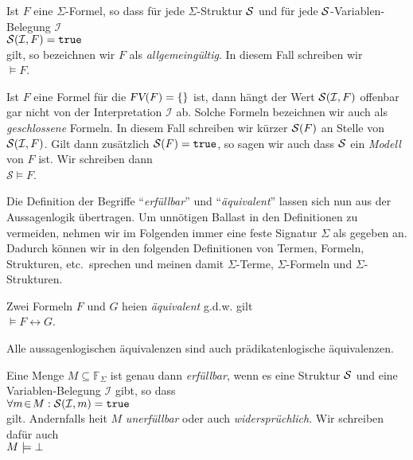 \begin{Definition}
    Ist $F$ eine $\Sigma$-Formel, so dass f\"{u}r jede $\Sigma$-Struktur $\mathcal{S}$ und f\"{u}r jede
    $\mathcal{S}$-Variablen-Belegung $\mathcal{I}$ \\[0.2cm]
    \hspace*{1.3cm} $\mathcal{S}(\mathcal{I}, F) = \mathtt{true}$ \\[0.2cm]
    gilt, so bezeichnen wir $F$ als \emph{allgemeing\"{u}ltig}.  In diesem Fall schreiben wir \\[0.2cm]
    \hspace*{1.3cm} $\models F$. 
    \eox
\end{Definition}

Ist $F$ eine Formel f\"{u}r die $\textsl{FV}(F) = \{\}$ ist, dann h\"{a}ngt der Wert $\mathcal{S}(\mathcal{I}, F)$
offenbar gar nicht von der Interpretation $\mathcal{I}$ ab.  Solche Formeln bezeichnen wir auch als 
\emph{geschlossene} Formeln.   In diesem Fall schreiben wir k\"{u}rzer  $\mathcal{S}(F)$
an Stelle von $\mathcal{S}(\mathcal{I}, F)$.  Gilt dann zus\"{a}tzlich $\mathcal{S}(F) = \mathtt{true}$, 
so sagen wir auch dass $\mathcal{S}$ ein \emph{Modell} von $F$ ist.  Wir schreiben dann \\[0.2cm]
\hspace*{1.3cm} $\mathcal{S} \models F$.
\vspace{0.1cm}

Die Definition der Begriffe ``\emph{erf\"{u}llbar}'' und
``\emph{\"{a}quivalent}'' lassen sich nun aus der Aussagenlogik \"{u}bertragen. 
Um unn\"{o}tigen Ballast in den Definitionen zu vermeiden, nehmen wir im Folgenden immer eine
feste Signatur $\Sigma$ als gegeben an.  Dadurch k\"{o}nnen wir in den folgenden Definitionen
von Termen, Formeln, Strukturen, etc.~sprechen und meinen damit  $\Sigma$-Terme,
$\Sigma$-Formeln und $\Sigma$-Strukturen.

\begin{Definition}[\"{a}quivalent]
  Zwei Formeln $F$ und $G$ hei\3en \emph{\"{a}quivalent} g.d.w. gilt \\[0.2cm]
  \hspace*{1.3cm} $\models F \leftrightarrow G$.
  \eox
\end{Definition}

\noindent
Alle aussagenlogischen \"{a}quivalenzen sind auch pr\"{a}dikatenlogische \"{a}quivalenzen.

\begin{Definition}
    Eine Menge $M \subseteq \mathbb{F}_\Sigma$ ist genau dann \emph{erf\"{u}llbar},
    wenn es eine Struktur $\mathcal{S}$ und eine Variablen-Belegung $\mathcal{I}$ gibt, so dass 
      \\[0.2cm]
    \hspace*{1.3cm} $\forall m \!\in\! M: \mathcal{S}(\mathcal{I},m) = \mathtt{true}$ \\[0.2cm]
    gilt.  Andernfalls hei\3t $M$ \emph{unerf\"{u}llbar} oder auch \emph{widerspr\"{u}chlich}. 
    Wir schreiben daf\"{u}r auch \\[0.2cm]
    \hspace*{1.3cm} $M \models \bot$
    \eox
\end{Definition}

